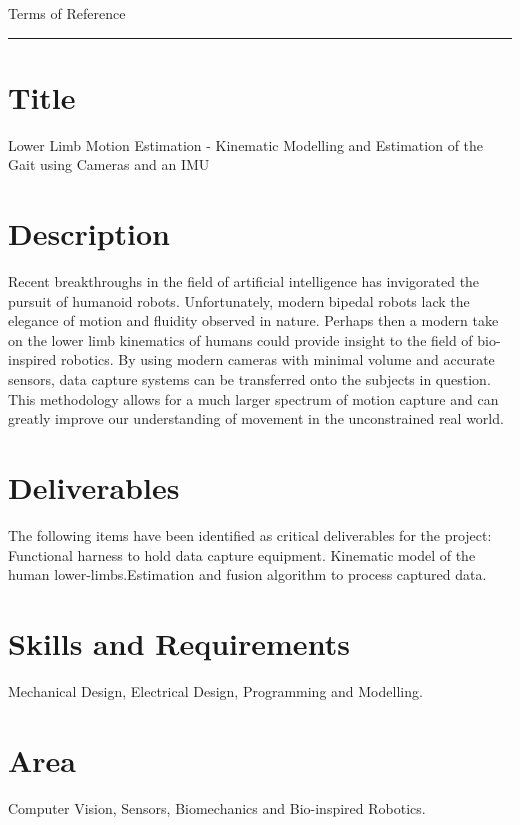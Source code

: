\pagestyle{plain}


{\Large Terms of Reference}\\
\hrule
\vskip 5mm

\section*{Title}
Lower Limb Motion Estimation - Kinematic Modelling and Estimation of the Gait using Cameras and an IMU
\vskip -3mm

\section*{Description}
Recent breakthroughs in the field of artificial intelligence has invigorated the pursuit of humanoid robots. Unfortunately, modern bipedal robots lack the elegance of motion and fluidity observed in nature. Perhaps then a modern take on the lower limb kinematics of humans could provide insight to the field of bio-inspired robotics. By using modern cameras with minimal volume and accurate sensors, data capture systems can be transferred onto the subjects in question. This methodology allows for a much larger spectrum of motion capture and can greatly improve our understanding of movement in the unconstrained real world.

\section*{Deliverables}
The following items have been identified as critical deliverables for the project: Functional harness to hold data capture equipment.  Kinematic model of the human lower-limbs.Estimation and fusion algorithm to process captured data. 
 
\section*{Skills and Requirements}
Mechanical Design, Electrical Design, Programming and Modelling.

\section*{Area}  
Computer Vision, Sensors, Biomechanics and Bio-inspired Robotics.

